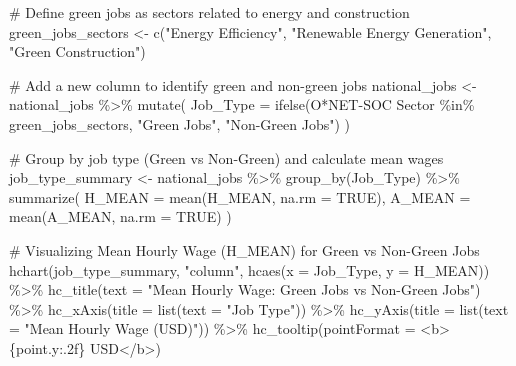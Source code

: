 \documentclass[
  letterpaper,
  DIV=11,
  numbers=noendperiod]{scrartcl}
\newenvironment{Shaded}{\begin{snugshade}}{\end{snugshade}}
\newcommand{\AttributeTok}[1]{\textcolor[rgb]{0.40,0.45,0.13}{#1}}
\newcommand{\CommentTok}[1]{\textcolor[rgb]{0.37,0.37,0.37}{#1}}
\newcommand{\ConstantTok}[1]{\textcolor[rgb]{0.56,0.35,0.01}{#1}}
\newcommand{\FunctionTok}[1]{\textcolor[rgb]{0.28,0.35,0.67}{#1}}
\newcommand{\NormalTok}[1]{\textcolor[rgb]{0.00,0.23,0.31}{#1}}
\newcommand{\OtherTok}[1]{\textcolor[rgb]{0.00,0.23,0.31}{#1}}
\newcommand{\SpecialCharTok}[1]{\textcolor[rgb]{0.37,0.37,0.37}{#1}}
\newcommand{\StringTok}[1]{\textcolor[rgb]{0.13,0.47,0.30}{#1}}
\begin{document}
\begin{Shaded}
\begin{Highlighting}[]
\CommentTok{\# Define green jobs as sectors related to energy and construction}
\NormalTok{green\_jobs\_sectors }\OtherTok{\textless{}{-}} \FunctionTok{c}\NormalTok{(}\StringTok{"Energy Efficiency"}\NormalTok{, }\StringTok{"Renewable Energy Generation"}\NormalTok{, }\StringTok{"Green Construction"}\NormalTok{)}

\CommentTok{\# Add a new column to identify green and non{-}green jobs}
\NormalTok{national\_jobs }\OtherTok{\textless{}{-}}\NormalTok{ national\_jobs }\SpecialCharTok{\%\textgreater{}\%}
  \FunctionTok{mutate}\NormalTok{(}
    \AttributeTok{Job\_Type =} \FunctionTok{ifelse}\NormalTok{(}\StringTok{\textasciigrave{}}\AttributeTok{O*NET{-}SOC Sector}\StringTok{\textasciigrave{}} \SpecialCharTok{\%in\%}\NormalTok{ green\_jobs\_sectors, }\StringTok{"Green Jobs"}\NormalTok{, }\StringTok{"Non{-}Green Jobs"}\NormalTok{)}
\NormalTok{  )}

\CommentTok{\# Group by job type (Green vs Non{-}Green) and calculate mean wages}
\NormalTok{job\_type\_summary }\OtherTok{\textless{}{-}}\NormalTok{ national\_jobs }\SpecialCharTok{\%\textgreater{}\%}
  \FunctionTok{group\_by}\NormalTok{(Job\_Type) }\SpecialCharTok{\%\textgreater{}\%}
  \FunctionTok{summarize}\NormalTok{(}
    \AttributeTok{H\_MEAN =} \FunctionTok{mean}\NormalTok{(H\_MEAN, }\AttributeTok{na.rm =} \ConstantTok{TRUE}\NormalTok{),}
    \AttributeTok{A\_MEAN =} \FunctionTok{mean}\NormalTok{(A\_MEAN, }\AttributeTok{na.rm =} \ConstantTok{TRUE}\NormalTok{)}
\NormalTok{  )}

\CommentTok{\# Visualizing Mean Hourly Wage (H\_MEAN) for Green vs Non{-}Green Jobs}
\FunctionTok{hchart}\NormalTok{(job\_type\_summary, }\StringTok{"column"}\NormalTok{, }\FunctionTok{hcaes}\NormalTok{(}\AttributeTok{x =}\NormalTok{ Job\_Type, }\AttributeTok{y =}\NormalTok{ H\_MEAN)) }\SpecialCharTok{\%\textgreater{}\%}
  \FunctionTok{hc\_title}\NormalTok{(}\AttributeTok{text =} \StringTok{"Mean Hourly Wage: Green Jobs vs Non{-}Green Jobs"}\NormalTok{) }\SpecialCharTok{\%\textgreater{}\%}
  \FunctionTok{hc\_xAxis}\NormalTok{(}\AttributeTok{title =} \FunctionTok{list}\NormalTok{(}\AttributeTok{text =} \StringTok{"Job Type"}\NormalTok{)) }\SpecialCharTok{\%\textgreater{}\%}
  \FunctionTok{hc\_yAxis}\NormalTok{(}\AttributeTok{title =} \FunctionTok{list}\NormalTok{(}\AttributeTok{text =} \StringTok{"Mean Hourly Wage (USD)"}\NormalTok{)) }\SpecialCharTok{\%\textgreater{}\%}
  \FunctionTok{hc\_tooltip}\NormalTok{(}\AttributeTok{pointFormat =} \StringTok{\textquotesingle{}\textless{}b\textgreater{}\{point.y:.2f\} USD\textless{}/b\textgreater{}\textquotesingle{}}\NormalTok{)}
\end{Highlighting}
\end{Shaded}
\end{document}
